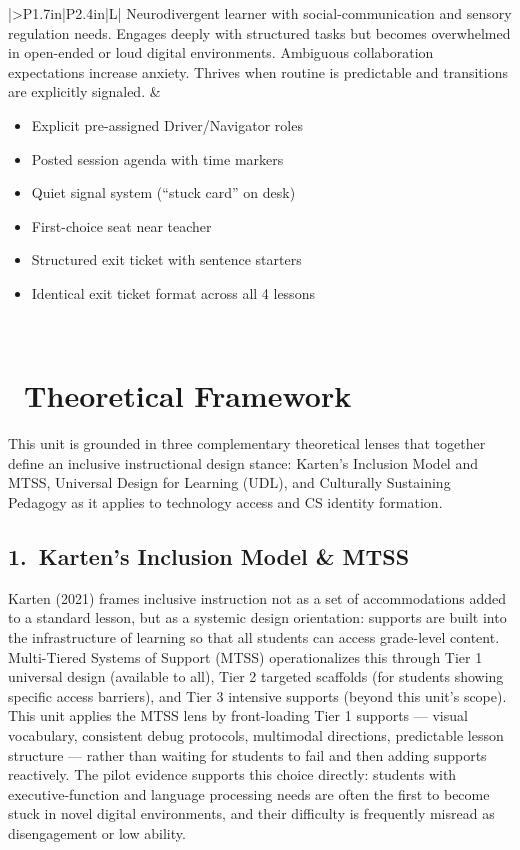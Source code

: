 \documentclass[12pt]{article}
\begin{document}
\begin{tabularx}{\textwidth}{|>{\bfseries\color{brickRed}}P{1.7in}|P{2.4in}|L|}
  Neurodivergent learner with social-communication and sensory regulation needs. Engages deeply with structured tasks but becomes overwhelmed in open-ended or loud digital environments. Ambiguous collaboration expectations increase anxiety. Thrives when routine is predictable and transitions are explicitly signaled. &
  \begin{itemize}[nosep]
  \item Explicit pre-assigned Driver/Navigator roles
  \item Posted session agenda with time markers
  \item Quiet signal system (``stuck card'' on desk)
  \item First-choice seat near teacher
  \item Structured exit ticket with sentence starters
  \item Identical exit ticket format across all 4 lessons
  \end{itemize} \\
\hline
\end{tabularx}

\section{\texorpdfstring{\faBrain\ Theoretical Framework}{Theoretical Framework}}

This unit is grounded in three complementary theoretical lenses that together define an inclusive instructional design stance: Karten's Inclusion Model and MTSS, Universal Design for Learning (UDL), and Culturally Sustaining Pedagogy as it applies to technology access and CS identity formation.

\subsection{1.\ Karten's Inclusion Model \& MTSS}

Karten (2021) frames inclusive instruction not as a set of accommodations added to a standard lesson, but as a systemic design orientation: supports are built into the infrastructure of learning so that all students can access grade-level content. Multi-Tiered Systems of Support (MTSS) operationalizes this through Tier 1 universal design (available to all), Tier 2 targeted scaffolds (for students showing specific access barriers), and Tier 3 intensive supports (beyond this unit's scope). This unit applies the MTSS lens by front-loading Tier 1 supports --- visual vocabulary, consistent debug protocols, multimodal directions, predictable lesson structure --- rather than waiting for students to fail and then adding supports reactively. The pilot evidence supports this choice directly: students with executive-function and language processing needs are often the first to become stuck in novel digital environments, and their difficulty is frequently misread as disengagement or low ability.
\end{document}
